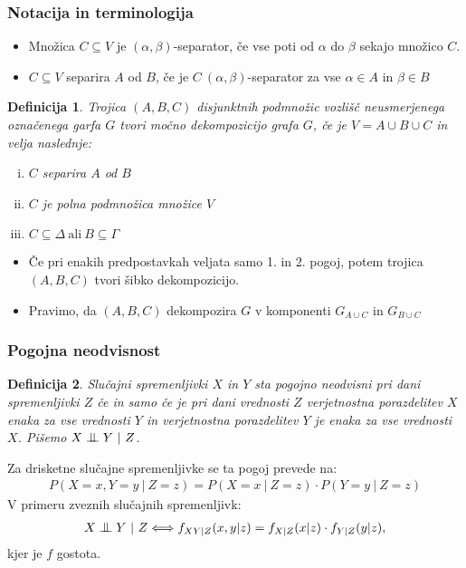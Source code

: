 \documentclass{beamer}
\newtheorem{definicija}{Definicija}
\newcommand{\cond}{\mathrel{\text{\scalebox{1.07}{$\perp\mkern-10mu\perp$}}}}
\begin{document}
\begin{frame}
    \frametitle{Notacija in terminologija}
    \begin{itemize}
        \item Množica $C \subseteq V $ je $ (\alpha, \beta)$-separator, če vse poti od $\alpha$ do $\beta$ sekajo 
        množico $C$.
        \item $C \subseteq V $ separira $A$ od $B$, če je $C ~ (\alpha, \beta)$-separator za vse $\alpha \in A$
        in $\beta \in B$
    \end{itemize}
    \begin{definicija}
        Trojica $(A, B, C)$ disjunktnih podmnožic vozlišč neusmerjenega označenega garfa $G$ tvori
        močno dekompozicijo grafa $G$, če je $V = A \cup B \cup C$ in velja naslednje:
        \begin{enumerate}[(i)]
            \item $C$ separira $A$ od $B$
            \item $C$ je polna podmnožica množice $V$
            \item $C \subseteq \Delta ~ \text{ali} ~ B \subseteq \Gamma$
        \end{enumerate}
    \end{definicija}
    \begin{itemize}
        \item Če pri enakih predpostavkah veljata samo 1. in 2. pogoj, potem trojica  $(A, B, C)$
        tvori šibko dekompozicijo.
        \item Pravimo, da $(A, B, C)$ dekompozira $G$ v komponenti $G_{A \cup C}$ 
        in $G_{B \cup C} $
    \end{itemize}

\end{frame}
\begin{frame}
    \frametitle{Pogojna neodvisnost}
    \begin{definicija}
        Slučajni spremenljivki $X$ in $Y$ sta pogojno neodvisni pri dani spremenljivki
        $Z$  če in samo če je pri dani vrednosti $Z$ verjetnostna porazdelitev $X$ enaka
        za vse vrednosti $Y$ in verjetnostna porazdelitev $Y$ je enaka za vse vrednosti
        $X$. Pišemo $ X \cond Y ~|~ Z $. 
    \end{definicija}
    Za drisketne slučajne spremenljivke se ta pogoj prevede na: 
    \begin{align*}
         P(X=x, Y=y ~|~ Z=z) = P(X=x~|~Z=z) \cdot P(Y=y~|~Z=z) 
    \end{align*} 
    V primeru zveznih slučajnih spremenljivk:
    \begin{align*}
        X \cond Y ~|~ Z \Longleftrightarrow  f_{XY|Z} (x,y|z) = f_{X|Z} (x|z) \cdot f_{Y|Z} (y|z),
    \end{align*}
    kjer je $f$ gostota.
\end{frame}
\end{document}
